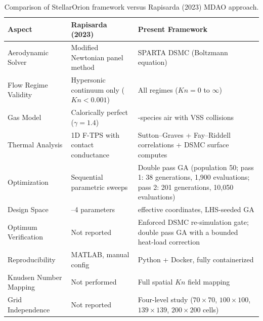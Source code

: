 \begin{table}[H]
    \centering
    \caption{Comparison of StellarOrion framework versus Rapisarda (2023) MDAO approach.}
    \label{tab:comparison_rapisarda}
    \begin{tabularx}{\textwidth}{>{\RaggedRight\arraybackslash}p{}>{\RaggedRight\arraybackslash}X>{\RaggedRight\arraybackslash}X}
        \hline
        \textbf{Aspect} & \textbf{Rapisarda (2023)} & \textbf{Present Framework} \\
        \hline
        Aerodynamic Solver & Modified Newtonian panel method & SPARTA DSMC (Boltzmann equation) \\
        Flow Regime Validity & Hypersonic continuum only ($Kn < 0.001$) & All regimes ($Kn = 0$ to $\infty$) \\
        Gas Model & Calorically perfect ($\gamma = 1.4$) & 5-species air with VSS collisions \\
        Thermal Analysis & 1D F-TPS with contact conductance & Sutton--Graves + Fay--Riddell correlations + DSMC surface computes \\
        Optimization & Sequential parametric sweeps & Double pass GA (population 50; pass 1: 38 generations, 1,900 evaluations; pass 2: 201 generations, 10,050 evaluations) \\
        Design Space & 3--4 parameters & 5 effective coordinates, LHS-seeded GA \\
        Optimum Verification & Not reported & Enforced DSMC re-simulation gate; double pass GA with a bounded heat-load correction \\

        Reproducibility & MATLAB, manual config & Python + Docker, fully containerized \\
        Knudsen Number Mapping & Not performed & Full spatial $Kn$ field mapping \\
        Grid Independence & Not reported & Four-level study ($70\times70$, $100\times100$, $139\times139$, $200\times200$ cells) \\
        \bottomrule
    \end{tabularx}
\end{table}
